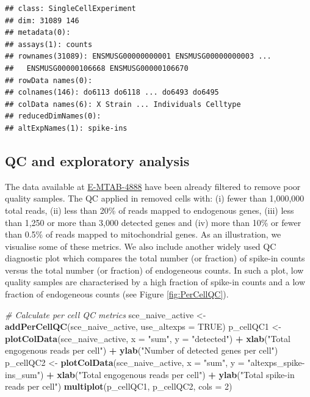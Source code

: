 \documentclass[9pt,a4paper,]{extarticle}
\newenvironment{Shaded}{\begin{snugshade}}{\end{snugshade}}
\newcommand{\CommentTok}[1]{\textcolor[rgb]{0.56,0.35,0.01}{\textit{#1}}}
\newcommand{\DataTypeTok}[1]{\textcolor[rgb]{0.13,0.29,0.53}{#1}}
\newcommand{\DecValTok}[1]{\textcolor[rgb]{0.00,0.00,0.81}{#1}}
\newcommand{\KeywordTok}[1]{\textcolor[rgb]{0.13,0.29,0.53}{\textbf{#1}}}
\newcommand{\NormalTok}[1]{#1}
\newcommand{\OperatorTok}[1]{\textcolor[rgb]{0.81,0.36,0.00}{\textbf{#1}}}
\newcommand{\OtherTok}[1]{\textcolor[rgb]{0.56,0.35,0.01}{#1}}
\newcommand{\StringTok}[1]{\textcolor[rgb]{0.31,0.60,0.02}{#1}}
\begin{document}
\begin{verbatim}
## class: SingleCellExperiment 
## dim: 31089 146 
## metadata(0):
## assays(1): counts
## rownames(31089): ENSMUSG00000000001 ENSMUSG00000000003 ...
##   ENSMUSG00000106668 ENSMUSG00000106670
## rowData names(0):
## colnames(146): do6113 do6118 ... do6493 do6495
## colData names(6): X Strain ... Individuals Celltype
## reducedDimNames(0):
## altExpNames(1): spike-ins
\end{verbatim}

\hypertarget{qc-and-exploratory-analysis}{%
\subsection{QC and exploratory analysis}\label{qc-and-exploratory-analysis}}

The data available at
\href{https://www.ebi.ac.uk/arrayexpress/experiments/E-MTAB-4888/}{E-MTAB-4888} have
been already filtered to remove poor quality samples.
The QC applied in \citep{Martinez-jimenez2017} removed cells with: (i) fewer
than 1,000,000 total reads, (ii) less than 20\% of reads mapped to
endogenous genes, (iii) less than 1,250 or more than 3,000 detected genes and
(iv) more than 10\% or fewer than 0.5\% of reads mapped to mitochondrial genes.
As an illustration, we visualise some of these metrics.
We also include another widely used QC diagnostic plot which compares the total
number (or fraction) of spike-in counts versus the total number (or fraction) of
endogeneous counts.
In such a plot, low quality samples are characterised by a high fraction of
spike-in counts and a low fraction of endogeneous counts
(see Figure \ref{fig:PerCellQC}).

\begin{Shaded}
\begin{Highlighting}[]
\CommentTok{# Calculate per cell QC metrics}
\NormalTok{sce_naive_active <-}\StringTok{ }\KeywordTok{addPerCellQC}\NormalTok{(sce_naive_active, }\DataTypeTok{use_altexps =} \OtherTok{TRUE}\NormalTok{)}
\NormalTok{p_cellQC1 <-}\StringTok{ }\KeywordTok{plotColData}\NormalTok{(sce_naive_active, }\DataTypeTok{x =} \StringTok{"sum"}\NormalTok{, }\DataTypeTok{y =} \StringTok{"detected"}\NormalTok{) }\OperatorTok{+}
\StringTok{  }\KeywordTok{xlab}\NormalTok{(}\StringTok{"Total engogenous reads per cell"}\NormalTok{) }\OperatorTok{+}
\StringTok{  }\KeywordTok{ylab}\NormalTok{(}\StringTok{"Number of detected genes per cell"}\NormalTok{)}
\NormalTok{p_cellQC2 <-}\StringTok{ }\KeywordTok{plotColData}\NormalTok{(sce_naive_active, }\DataTypeTok{x =} \StringTok{"sum"}\NormalTok{, }\DataTypeTok{y =} \StringTok{"altexps_spike-ins_sum"}\NormalTok{) }\OperatorTok{+}
\StringTok{  }\KeywordTok{xlab}\NormalTok{(}\StringTok{"Total engogenous reads per cell"}\NormalTok{) }\OperatorTok{+}
\StringTok{  }\KeywordTok{ylab}\NormalTok{(}\StringTok{"Total spike-in reads per cell"}\NormalTok{)}
\KeywordTok{multiplot}\NormalTok{(p_cellQC1, p_cellQC2, }\DataTypeTok{cols =} \DecValTok{2}\NormalTok{)}
\end{Highlighting}
\end{Shaded}
\end{document}
